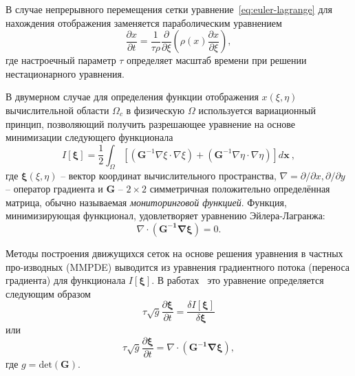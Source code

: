 В случае непрерывного перемещения сетки уравнение~\eqref{eq:euler-lagrange} для нахождения отображения  заменяется параболическим уравнением~\cite{huang_practical_2001}
\begin{equation}
\frac{\partial x}{\partial t} = \frac{1}{\tau \rho}\frac{\partial}{\partial \xi}\left(\rho(x)\frac{\partial x}{\partial \xi} \right),
\label{eq:MMPDE5}
\end{equation} 
где настроечный параметр  $\tau$ определяет масштаб времени при решении нестационарного уравнения.

В двумерном случае для определения функции отображения  $x(\xi, \eta)$ вычислительной области $\Omega_c$  в физическую $\Omega$  используется вариационный принцип, позволяющий получить разрешающее уравнение на основе минимизации следующего функционала~\cite{huang_moving_1998, henderson1997nonlinear}
\begin{equation}\label{eq:functional2d}
I[\boldsymbol\xi] = \frac{1}{2} \int_{\Omega}\left[\left(\mathbf{G}^{-1}\nabla\xi\cdot\nabla\xi\right)+\left(\mathbf{G}^{-1}\nabla\eta\cdot\nabla\eta\right)\right]d\mathbf{x}\ ,
\end{equation}
где  $\boldsymbol{\xi}(\xi, \eta)$ – вектор координат вычислительного пространства, $\nabla = \partial/\partial x, \partial/\partial y$   – оператор градиента и $\mathbf{G}$  –   $2\times2$ симметричная положительно определённая матрица, обычно называемая \textit{мониторинговой функцией}. Функция, минимизирующая функционал, удовлетворяет уравнению Эйлера-Лагранжа:
\begin{equation}
\nabla \cdot \left(\mathbf{G^{-1}\nabla \boldsymbol\xi}\right) = 0.
\end{equation}

Методы построения движущихся сеток на основе решения уравнения в частных про-изводных (MMPDE) выводится из уравнения градиентного потока (переноса градиента) для функционала $I[\boldsymbol\xi]$. В работах~\cite{huang_moving_1998, henderson1997nonlinear} это уравнение определяется следующим образом
\begin{equation}
\tau \sqrt{g} \frac{\partial \boldsymbol\xi}{\partial t} = \frac{\delta I[\boldsymbol\xi]}{\delta \boldsymbol\xi}
\end{equation}
или
\begin{equation}\label{eq:MMPDE}
\tau \sqrt{g} \frac{\partial \boldsymbol\xi}{\partial t} =\nabla \cdot \left(\mathbf{G^{-1}\nabla \boldsymbol\xi}\right),
\end{equation}
где $g =\mathrm{det}(\mathbf{G})$.

